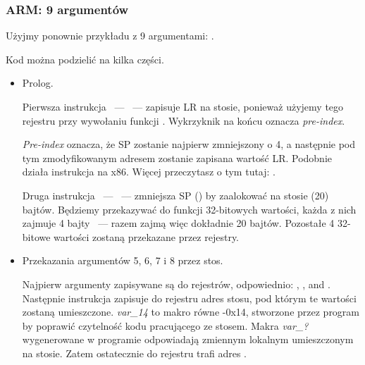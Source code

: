 \subsubsection{ARM: 9 argumentów}

Użyjmy ponownie przykładu z 9 argumentami: .



\myparagraph{\OptimizingKeilVI: \ARMMode}



Kod można podzielić na kilka części.

\begin{itemize}
\item Prolog.

Pierwsza instrukcja ~---  ~--- zapisuje \ac{LR} na stosie, ponieważ użyjemy tego rejestru przy wywołaniu funkcji \printf.
Wykrzyknik na końcu oznacza \emph{pre-index}.

\emph{Pre-index} oznacza, że \ac{SP} zostanie najpierw zmniejszony o 4, a następnie pod tym zmodyfikowanym adresem zostanie zapisana wartość \ac{LR}.
Podobnie działa instrukcja \PUSH na x86.
Więcej przeczytasz o tym tutaj: .

Druga instrukcja ~---  ~--- zmniejsza \ac{SP} () by zaalokować na stosie  (20) bajtów.
Będziemy przekazywać do funkcji  32-bitowych wartości, każda z nich zajmuje 4 bajty ~--- razem zajmą więc dokładnie 20 bajtów.
Pozostałe 4 32-bitowe wartości zostaną przekazane przez rejestry.

\item Przekazania argumentów 5, 6, 7 i 8 przez stos.

Najpierw argumenty zapisywane są do rejestrów, odpowiednio: , ,  and . Następnie instrukcja  zapisuje do rejestru  adres stosu, pod którym te wartości zostaną umieszczone.
\emph{var\_14} to makro równe -0x14, stworzone przez program \IDA by poprawić czytelność kodu pracującego ze stosem.
Makra \emph{var\_?} wygenerowane w programie \IDA odpowiadają zmiennym lokalnym umieszczonym na stosie.
Zatem ostatecznie do rejestru  trafi adres .


\end{itemize}
